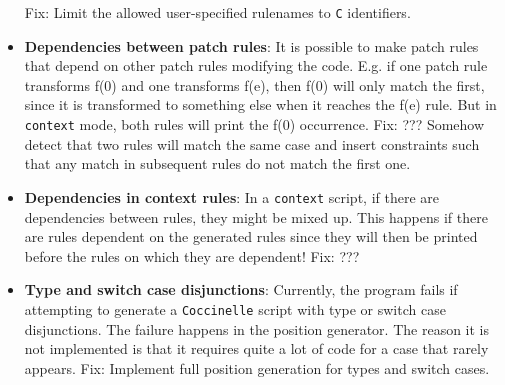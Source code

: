 \begin{itemize}
Fix: Limit the allowed user-specified rulenames to \texttt{C} identifiers.
\item \textbf{Dependencies between patch rules}: It is possible to make patch rules that depend on other patch rules modifying the code. E.g. if one patch rule transforms f(0) and one transforms f(e), then f(0) will only match the first, since it is transformed to something else when it reaches the f(e) rule. But in \texttt{context} mode, both rules will print the f(0) occurrence.\newline
Fix: ??? Somehow detect that two rules will match the same case and insert constraints such that any match in subsequent rules do not match the first one.
\item \textbf{Dependencies in context rules}: In a \texttt{context} script, if there are dependencies between rules, they might be mixed up. This happens if there are rules dependent on the generated rules since they will then be printed before the rules on which they are dependent!\newline
Fix: ???
\item \textbf{Type and switch case disjunctions}: Currently, the program fails if attempting to generate a \texttt{Coccinelle} script with type or switch case disjunctions. The failure happens in the position generator. The reason it is not implemented is that it requires quite a lot of code for a case that rarely appears.\newline
Fix: Implement full position generation for types and switch cases.
\end{itemize}
